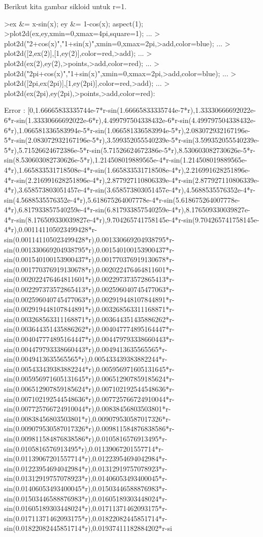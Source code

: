 \documentclass[a4paper,10pt]{article}
\begin{document}
\begin{eulernotebook}
\begin{euleroutput}
\end{euleroutput}
\begin{eulercomment}
Berikut kita gambar sikloid untuk r=1.
\end{eulercomment}
\begin{eulerprompt}
>ex &= x-sin(x); ey &= 1-cos(x); aspect(1);
>plot2d(ex,ey,xmin=0,xmax=4pi,square=1); ...
>  plot2d("2+cos(x)","1+sin(x)",xmin=0,xmax=2pi,>add,color=blue); ...
>  plot2d([2,ex(2)],[1,ey(2)],color=red,>add); ...
>  plot2d(ex(2),ey(2),>points,>add,color=red); ...
>  plot2d("2pi+cos(x)","1+sin(x)",xmin=0,xmax=2pi,>add,color=blue); ...
>  plot2d([2pi,ex(2pi)],[1,ey(2pi)],color=red,>add);  ...
>  plot2d(ex(2pi),ey(2pi),>points,>add,color=red):
\end{eulerprompt}
\begin{euleroutput}
  Error : [0,1.66665833335744e-7*r-sin(1.66665833335744e-7*r),1.33330666692022e-6*r-sin(1.33330666692022e-6*r),4.499797504338432e-6*r-sin(4.499797504338432e-6*r),1.066581336583994e-5*r-sin(1.066581336583994e-5*r),2.083072932167196e-5*r-sin(2.083072932167196e-5*r),3.599352055540239e-5*r-sin(3.599352055540239e-5*r),5.71526624672386e-5*r-sin(5.71526624672386e-5*r),8.530603082730626e-5*r-sin(8.530603082730626e-5*r),1.214508019889565e-4*r-sin(1.214508019889565e-4*r),1.665833531718508e-4*r-sin(1.665833531718508e-4*r),2.216991628251896e-4*r-sin(2.216991628251896e-4*r),2.877927110806339e-4*r-sin(2.877927110806339e-4*r),3.658573803051457e-4*r-sin(3.658573803051457e-4*r),4.5688535576352e-4*r-sin(4.5688535576352e-4*r),5.618675264007778e-4*r-sin(5.618675264007778e-4*r),6.817933857540259e-4*r-sin(6.817933857540259e-4*r),8.176509330039827e-4*r-sin(8.176509330039827e-4*r),9.704265741758145e-4*r-sin(9.704265741758145e-4*r),0.001141105023499428*r-sin(0.001141105023499428*r),0.001330669204938795*r-sin(0.001330669204938795*r),0.001540100153900437*r-sin(0.001540100153900437*r),0.001770376919130678*r-sin(0.001770376919130678*r),0.002022476464811601*r-sin(0.002022476464811601*r),0.002297373572865413*r-sin(0.002297373572865413*r),0.002596040745477063*r-sin(0.002596040745477063*r),0.002919448107844891*r-sin(0.002919448107844891*r),0.003268563311168871*r-sin(0.003268563311168871*r),0.003644351435886262*r-sin(0.003644351435886262*r),0.004047774895164447*r-sin(0.004047774895164447*r),0.004479793338660443*r-sin(0.004479793338660443*r),0.0049413635565565*r-sin(0.0049413635565565*r),0.005433439383882244*r-sin(0.005433439383882244*r),0.005956971605131645*r-sin(0.005956971605131645*r),0.006512907859185624*r-sin(0.006512907859185624*r),0.007102192544548636*r-sin(0.007102192544548636*r),0.007725766724910044*r-sin(0.007725766724910044*r),0.00838456803503801*r-sin(0.00838456803503801*r),0.009079530587017326*r-sin(0.009079530587017326*r),0.009811584876838586*r-sin(0.009811584876838586*r),0.0105816576913495*r-sin(0.0105816576913495*r),0.01139067201557714*r-sin(0.01139067201557714*r),0.01223954694042984*r-sin(0.01223954694042984*r),0.01312919757078923*r-sin(0.01312919757078923*r),0.01406053493400045*r-sin(0.01406053493400045*r),0.01503446588876983*r-sin(0.01503446588876983*r),0.01605189303448024*r-sin(0.01605189303448024*r),0.01711371462093175*r-sin(0.01711371462093175*r),0.01822082445851714*r-sin(0.01822082445851714*r),0.01937411182884202*r-si
\end{euleroutput}
\end{eulernotebook}
\end{document}
